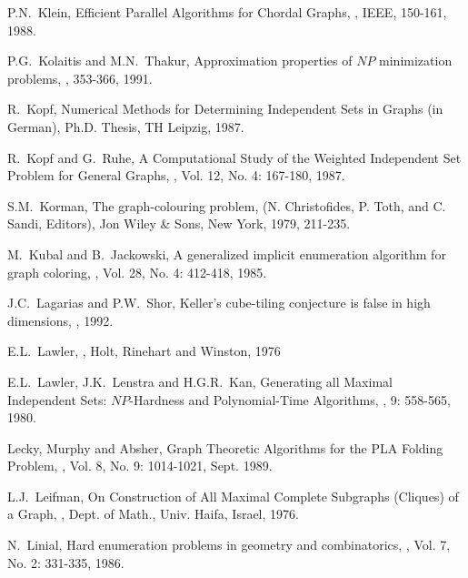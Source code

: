 \begin{thebibliography}{10}
P.N.~Klein,
\newblock Efficient Parallel Algorithms for Chordal Graphs,
, IEEE, 150-161, 1988.

P.G.~Kolaitis and M.N.~Thakur,
\newblock Approximation properties of $NP$ minimization problems,
, 353-366, 1991.

R.~Kopf,
\newblock Numerical Methods for Determining Independent Sets in
Graphs (in German),
\newblock Ph.D. Thesis, TH Leipzig, 1987.

R.~Kopf and G.~Ruhe,
\newblock A Computational Study of the Weighted Independent Set
Problem for General Graphs,
, Vol. 12, No. 4:
167-180, 1987.

S.M.~Korman,
\newblock The graph-colouring problem,
 (N. Christofides, P.  
Toth, and C. Sandi, Editors), Jon Wiley \& Sons, New York, 1979,  
211-235.

M.~Kubal and B.~Jackowski,
\newblock A generalized implicit enumeration algorithm for graph  
coloring,
, Vol. 28, No. 4: 412-418, 1985.

J.C.~Lagarias and P.W.~Shor,
\newblock Keller's cube-tiling conjecture is false in high
dimensions,
, 1992.

E.L.~Lawler,
,
\newblock Holt, Rinehart and Winston, 1976

E.L.~Lawler, J.K.~Lenstra and H.G.R.~Kan,
\newblock Generating all Maximal Independent Sets: $NP$-Hardness and
Polynomial-Time Algorithms,
, 9: 558-565, 1980.

Lecky, Murphy and Absher,
\newblock Graph Theoretic Algorithms for the PLA Folding Problem,
, Vol. 8,
No. 9: 1014-1021, Sept. 1989.

L.J.~Leifman,
\newblock On Construction of All Maximal Complete Subgraphs
(Cliques) of a Graph,
, Dept. of Math., Univ. Haifa, Israel,
1976.

N.~Linial,
\newblock Hard enumeration problems in geometry and combinatorics,
, Vol. 7, No. 2: 331-335,
1986.


\end{thebibliography}
